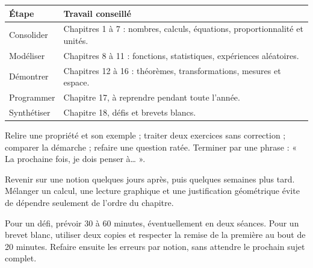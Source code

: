 \clearpage\thispagestyle{otFront}\label{parcours}\fontsize{11}{15}\selectfont

\begin{tabularx}{\linewidth}{@{}lY@{}}\toprule
Étape & Travail conseillé\\\midrule
Consolider & Chapitres 1 à 7 : nombres, calculs, équations, proportionnalité et unités.\\[3mm]
Modéliser & Chapitres 8 à 11 : fonctions, statistiques, expériences aléatoires.\\[3mm]
Démontrer & Chapitres 12 à 16 : théorèmes, transformations, mesures et espace.\\[3mm]
Programmer & Chapitre 17, à reprendre pendant toute l’année.\\[3mm]
Synthétiser & Chapitre 18, défis et brevets blancs.\\\bottomrule
\end{tabularx}
\begin{savoirfaire}Relire une propriété et son exemple ; traiter deux exercices sans correction ; comparer la démarche ; refaire une question ratée. Terminer par une phrase : « La prochaine fois, je dois penser à… ».\end{savoirfaire}
\begin{savoirfaire}Revenir sur une notion quelques jours après, puis quelques semaines plus tard. Mélanger un calcul, une lecture graphique et une justification géométrique évite de dépendre seulement de l’ordre du chapitre.\end{savoirfaire}
Pour un défi, prévoir 30 à 60 minutes, éventuellement en deux séances.
Pour un brevet blanc, utiliser deux copies et respecter la remise de la
première au bout de 20 minutes. Refaire ensuite les erreurs par notion,
sans attendre le prochain sujet complet.

\clearpage
